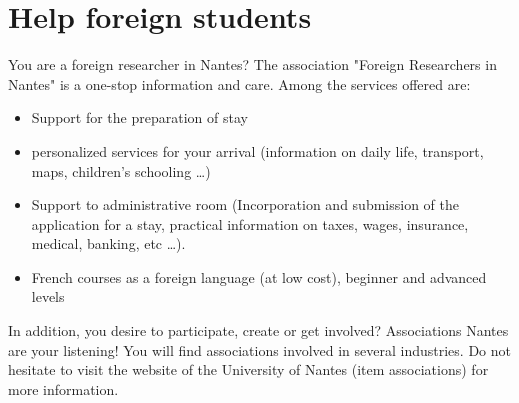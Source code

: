 \section{Help foreign students}
You are a foreign researcher in Nantes?
The association "Foreign Researchers in Nantes" is a one-stop information and care.
Among the services offered are:
\begin{itemize}
   \item Support for the preparation of stay
   \item personalized services for your arrival (information on daily life, transport, maps, children's schooling \dots)
   \item Support to administrative room (Incorporation and submission of the application for a stay, practical information on taxes, wages, insurance, medical, banking, etc \dots).
   \item French courses as a foreign language (at low cost), beginner and advanced levels
\end{itemize}

In addition, you desire to participate, create or get involved?
Associations Nantes are your listening!
You will find associations involved in several industries.
Do not hesitate to visit the website of the University of Nantes (item associations) for more information.



